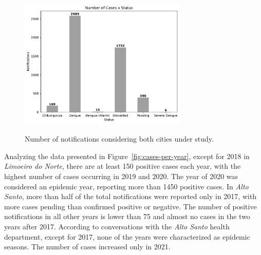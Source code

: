 \begin{center}
	\begin{figure}[ht!]
		\centering
		\includegraphics[width=8cm, height=7cm]{images/cases-per-status.pdf}
		\caption{Number of notifications considering both cities under
			study.}\label{fig:cases-per-status}
	\end{figure}
\end{center}

Analyzing the data presented in Figure~\ref{fig:cases-per-year}, except for 2018
in \textit{Limoeiro do Norte}, there are at least 150 positive cases each year,
with the highest number of cases occurring in 2019 and 2020. The year of 2020
was considered an epidemic year, reporting more than 1450 positive cases. In
\textit{Alto Santo}, more than half of the total notifications were reported
only in 2017, with more cases pending than confirmed positive or negative. The
number of positive notifications in all other years is lower than 75 and almost
no cases in the two years after 2017. According to conversations with the
\textit{Alto Santo} health department, except for 2017, none of the years were
characterized as epidemic seasons. The number of cases increased only in 2021.



